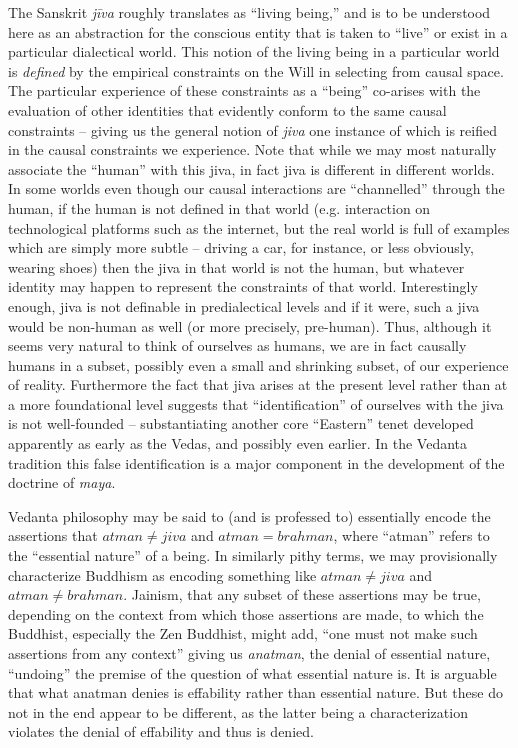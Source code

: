 \documentclass[pra,twocolumn,groupedaddress,10pt]{revtex4}
\theoremstyle{definition}
\begin{document}
\begin{enumerate}[label={[\textbf{\arabic*}]},start=0]
		The Sanskrit \emph{j\={i}va} roughly translates as ``living being,'' and is to be understood here as an abstraction for the conscious entity that is taken to ``live'' or exist in a particular dialectical world. This notion of the living being in a particular world is \emph{defined} by the empirical constraints on the Will in selecting from causal space. The particular experience of these constraints as a ``being'' co-arises with the evaluation of other identities that evidently conform to the same causal constraints -- giving us the general notion of \emph{jiva} one instance of which is reified in the causal constraints we experience. Note that while we may most naturally associate the ``human'' with this jiva, in fact jiva is different in different worlds. In some worlds even though our causal interactions are ``channelled'' through the human, if the human is not defined in that world (e.g. interaction on technological platforms such as the internet, but the real world is full of examples which are simply more subtle -- driving a car, for instance, or less obviously, wearing shoes) then the jiva in that world is not the human, but whatever identity may happen to represent the constraints of that world. Interestingly enough, jiva is not definable in predialectical levels and if it were, such a jiva would be non-human as well (or more precisely, pre-human). Thus, although it seems very natural to think of ourselves as humans, we are in fact causally humans in a subset, possibly even a small and shrinking subset, of our experience of reality. Furthermore the fact that jiva arises at the present level rather than at a more foundational level suggests that ``identification'' of ourselves with the jiva is not well-founded -- substantiating another core ``Eastern'' tenet developed apparently as early as the Vedas, and possibly even earlier. In the Vedanta tradition this false identification is a major component in the development of the doctrine of \emph{maya}.

		Vedanta philosophy may be said to (and is professed to) essentially encode the assertions that $atman \ne jiva$ and $atman = brahman$, where ``atman'' refers to the ``essential nature'' of a being. In similarly pithy terms, we may provisionally characterize Buddhism as encoding something like $atman \ne jiva$ and $atman \ne brahman$. Jainism, that any subset of these assertions may be true, depending on the context from which those assertions are made, to which the Buddhist, especially the Zen Buddhist, might add, ``one must not make such assertions from any context'' giving us \emph{anatman}, the denial of essential nature, ``undoing'' the premise of the question of what essential nature is. It is arguable that what anatman denies is effability rather than essential nature. But these do not in the end appear to be different, as the latter being a characterization violates the denial of effability and thus is denied.


\end{enumerate}
\end{document}
